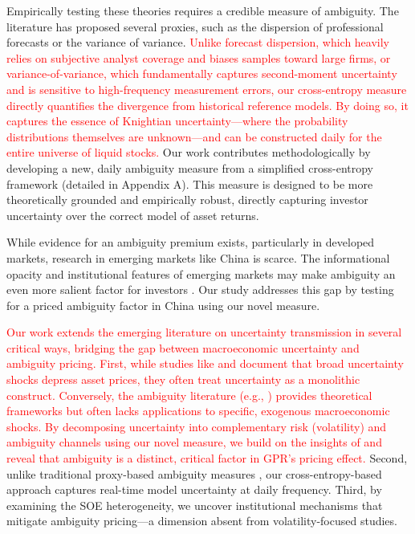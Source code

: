 \documentclass[preprint,12pt,authoryear]{elsarticle}
\begin{document}
Empirically testing these theories requires a credible measure of ambiguity. The literature has proposed several proxies, such as the dispersion of professional forecasts \citep{Brenner2018, Ulrich2013} or the variance of variance. \textcolor{red}{Unlike forecast dispersion, which heavily relies on subjective analyst coverage and biases samples toward large firms, or variance-of-variance, which fundamentally captures second-moment uncertainty and is sensitive to high-frequency measurement errors, our cross-entropy measure directly quantifies the divergence from historical reference models. By doing so, it captures the essence of Knightian uncertainty---where the probability distributions themselves are unknown---and can be constructed daily for the entire universe of liquid stocks.} Our work contributes methodologically by developing a new, daily ambiguity measure from a simplified cross-entropy framework (detailed in Appendix A). This measure is designed to be more theoretically grounded and empirically robust, directly capturing investor uncertainty over the correct model of asset returns.

While evidence for an ambiguity premium exists, particularly in developed markets, research in emerging markets like China is scarce. The informational opacity and institutional features of emerging markets may make ambiguity an even more salient factor for investors \citep{Easley2009}. Our study addresses this gap by testing for a priced ambiguity factor in China using our novel measure.

\textcolor{red}{Our work extends the emerging literature on uncertainty transmission in several critical ways, bridging the gap between macroeconomic uncertainty and ambiguity pricing. First, while studies like \citet{Baker2016} and \citet{Caldara2022} document that broad uncertainty shocks depress asset prices, they often treat uncertainty as a monolithic construct. Conversely, the ambiguity literature (e.g., \citet{Brenner2018}) provides theoretical frameworks but often lacks applications to specific, exogenous macroeconomic shocks. By decomposing uncertainty into complementary risk (volatility) and ambiguity channels using our novel measure, we build on the insights of \citet{Brenner2018} and reveal that ambiguity is a distinct, critical factor in GPR's pricing effect.} Second, unlike traditional proxy-based ambiguity measures \citep{Brenner2018}, our cross-entropy-based approach captures real-time model uncertainty at daily frequency. Third, by examining the SOE heterogeneity, we uncover institutional mechanisms that mitigate ambiguity pricing---a dimension absent from volatility-focused studies.
\end{document}
